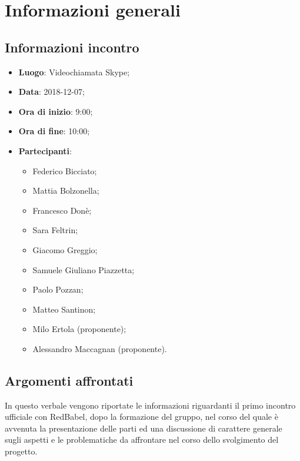 \section{Informazioni generali}

\subsection{Informazioni incontro}
\begin{itemize}
\item \textbf{Luogo}: Videochiamata Skype;
\item \textbf{Data}: 2018-12-07;
\item \textbf{Ora di inizio}: 9:00;
\item \textbf{Ora di fine}: 10:00;
\item \textbf{Partecipanti}: 
	\begin{itemize}
		\item Federico Bicciato;
		\item Mattia Bolzonella;
		\item Francesco Donè;
		\item Sara Feltrin;
		\item Giacomo Greggio;
		\item Samuele Giuliano Piazzetta;
		\item Paolo Pozzan;
		\item Matteo Santinon;
		\item Milo Ertola (proponente);
		\item Alessandro Maccagnan (proponente).
	\end{itemize}
\end{itemize}

\subsection{Argomenti affrontati}
In questo verbale vengono riportate le informazioni riguardanti il primo incontro ufficiale con RedBabel, dopo la formazione del gruppo, nel corso del quale è avvenuta la presentazione delle parti ed una discussione di carattere generale sugli aspetti e le problematiche da affrontare nel corso dello svolgimento del progetto.
